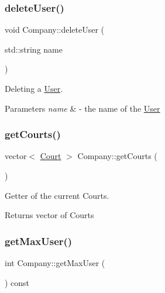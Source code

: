 \subsubsection{\texorpdfstring{delete\+User()}{deleteUser()}}
{\footnotesize\ttfamily void Company\+::delete\+User (\begin{DoxyParamCaption}\item[{std\+::string}]{name }\end{DoxyParamCaption})}



Deleting a \mbox{\hyperlink{class_user}{User}}. 


\begin{DoxyParams}{Parameters}
{\em name} & -\/ the name of the \mbox{\hyperlink{class_user}{User}} \\
\hline
\end{DoxyParams}
\mbox{\label{class_company_afa0ab125a0ba718fe2c13802fe1703be}} 
\subsubsection{\texorpdfstring{get\+Courts()}{getCourts()}}
{\footnotesize\ttfamily vector$<$ \mbox{\hyperlink{class_court}{Court}} $>$ Company\+::get\+Courts (\begin{DoxyParamCaption}{ }\end{DoxyParamCaption})}



Getter of the current Courts. 

\begin{DoxyReturn}{Returns}
vector of Courts 
\end{DoxyReturn}
\mbox{\label{class_company_a837fd39a8f03c20a3ceb8617410956b7}} 
\subsubsection{\texorpdfstring{get\+Max\+User()}{getMaxUser()}}
{\footnotesize\ttfamily int Company\+::get\+Max\+User (\begin{DoxyParamCaption}{ }\end{DoxyParamCaption}) const}



